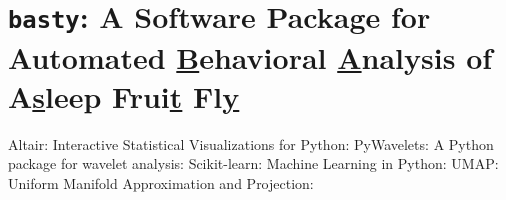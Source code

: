 \chapter{
  \texorpdfstring{
	  \texttt{basty}: A Software Package for Automated \underline{B}ehavioral \underline{A}nalysis of A\underline{s}leep Frui\underline{t} Fl\underline{y}
  }{
	  basty: A Software Package for Automated Behavioral Analysis of Asleep Fruit Fly
  }
 }

Altair: {Interactive} {Statistical} {Visualizations} for {Python}: \citep{vanderplas_altair_2018}
{PyWavelets}: {A} {Python} package for wavelet analysis: \citep{lee_pywavelets_2019}
Scikit-learn: {Machine} {Learning} in {Python}: \citep{pedregosa_scikit-learn_2011}
{UMAP}: {Uniform} {Manifold} {Approximation} and {Projection}: \citep{mcinnes_umap_2018}
